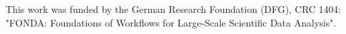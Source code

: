 \documentclass[sigconf,review,screen]{acmart}
\begin{document}
\maketitle















\begin{acks}
 This work was funded by the German Research
Foundation (DFG), CRC 1404: "FONDA: Foundations of
Workflows for Large-Scale Scientific Data Analysis".

\end{acks}

\clearpage




\clearpage

\end{document}
